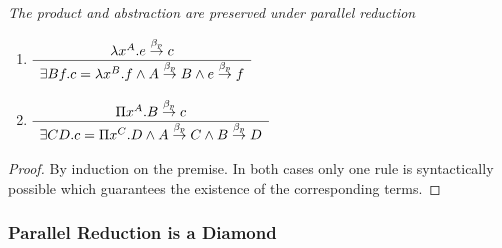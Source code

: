 \begin{lemma}
    \label{ParallelReductionProductAbstraction}
    \emph{The product and abstraction are preserved under parallel
    reduction}

    \begin{enumerate}
    \item
        $\begin{array}{c} \lambda x^A. e \stackrel{\beta_p}{\to} c \\ \hline \exists B f. c = \lambda x^B. f
            \land A \stackrel{\beta_p}{\to} B \land e \stackrel{\beta_p}{\to} f\end{array}$

    \item
        $\begin{array}{c} \Pi x^A. B \stackrel{\beta_p}{\to} c \\ \hline \exists C D. c = \Pi x^C. D
            \land A \stackrel{\beta_p}{\to} C \land B \stackrel{\beta_p}{\to} D\end{array}$
    \end{enumerate}

    \begin{proof} By induction on the premise. In both cases only one rule
    is syntactically possible which guarantees the existence of the
    corresponding terms.
    \end{proof}
\end{lemma}





\subsubsection{Parallel Reduction is a Diamond}


